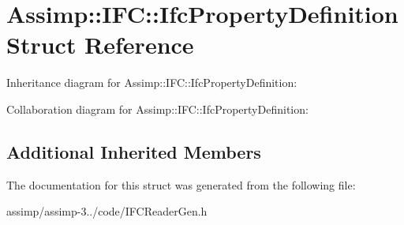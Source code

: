\hypertarget{struct_assimp_1_1_i_f_c_1_1_ifc_property_definition}{\section{Assimp\+:\+:I\+F\+C\+:\+:Ifc\+Property\+Definition Struct Reference}
\label{struct_assimp_1_1_i_f_c_1_1_ifc_property_definition}
}


Inheritance diagram for Assimp\+:\+:I\+F\+C\+:\+:Ifc\+Property\+Definition\+:


Collaboration diagram for Assimp\+:\+:I\+F\+C\+:\+:Ifc\+Property\+Definition\+:
\subsection*{Additional Inherited Members}


The documentation for this struct was generated from the following file\+:\begin{DoxyCompactItemize}
\item 
assimp/assimp-\/3../code/I\+F\+C\+Reader\+Gen.\+h\end{DoxyCompactItemize}

